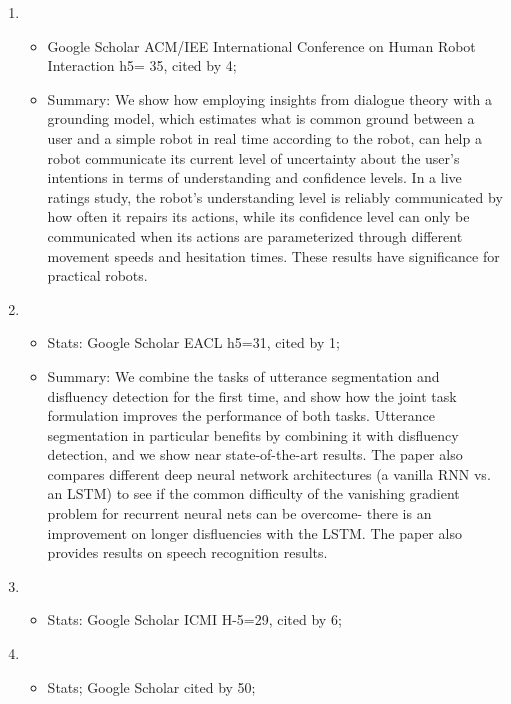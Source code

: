 \documentclass[12pt]{article}
\begin{document}
\begin{enumerate}
\item{}\begin{itemize}
\item[] Google Scholar ACM/IEE International Conference on Human Robot Interaction h5= 35, cited by 4; 
\item[] Summary: We show how employing insights from dialogue theory with a grounding model, which estimates what is common ground between a user and a simple robot in real time according to the robot, can help a robot communicate its current level of uncertainty about the user's intentions in terms of understanding and confidence levels. In a live ratings study, the robot's understanding level is reliably communicated by how often it repairs its actions, while its confidence level can only be communicated when its actions are parameterized through different movement speeds and hesitation times. These results have significance for practical robots.
\end{itemize}





\item{}
\begin{itemize}
\item[] Stats: Google Scholar EACL h5=31, cited by 1; 
\item[] Summary: We combine the tasks of utterance segmentation and disfluency detection for the first time, and show how the joint task formulation improves the performance of both tasks. Utterance segmentation in particular benefits by combining it with disfluency detection, and we show near state-of-the-art results. The paper also compares different deep neural network architectures (a vanilla RNN vs. an  LSTM) to see if the common difficulty of the vanishing gradient problem for recurrent neural nets can be overcome- there is an improvement on longer disfluencies with the LSTM. The paper also provides results on speech recognition results.
\end{itemize}

\item{}
\begin{itemize}
\item[] Stats: Google Scholar ICMI H-5=29, cited by 6;
\end{itemize}

\item{}
\begin{itemize}
\item[] Stats; Google Scholar cited by 50;
\end{itemize}


\end{enumerate}
\end{document}
